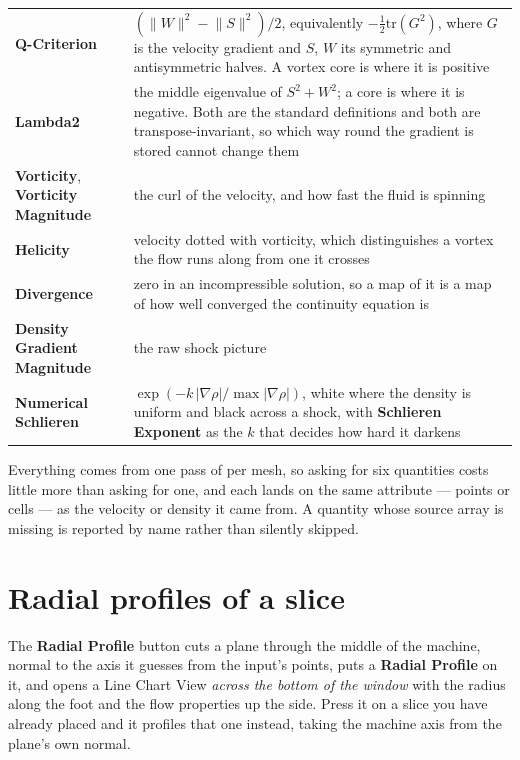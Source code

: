 \documentclass[11pt,a4paper]{article}
\newcommand{\prop}[1]{\textbf{#1}}          %
\newcommand{\menu}[1]{\textbf{#1}}          %
\begin{document}
\begin{center}
\begin{tabular}{@{}L{40mm}L{86mm}@{}}
\toprule
\prop{Q-Criterion} & $(\lVert W\rVert^2 - \lVert S\rVert^2)/2$, equivalently
  $-\tfrac{1}{2}\mathrm{tr}(G^2)$, where $G$ is the velocity gradient and $S$,
  $W$ its symmetric and antisymmetric halves. A vortex core is where it is
  positive \\
\prop{Lambda2} & the middle eigenvalue of $S^2 + W^2$; a core is where it is
  negative. Both are the standard definitions and both are transpose-invariant,
  so which way round the gradient is stored cannot change them \\
\prop{Vorticity}, \prop{Vorticity Magnitude} & the curl of the velocity, and how
  fast the fluid is spinning \\
\prop{Helicity} & velocity dotted with vorticity, which distinguishes a vortex
  the flow runs along from one it crosses \\
\prop{Divergence} & zero in an incompressible solution, so a map of it is a map
  of how well converged the continuity equation is \\
\prop{Density Gradient Magnitude} & the raw shock picture \\
\prop{Numerical Schlieren} & $\exp(-k\,|\nabla\rho| / \max|\nabla\rho|)$, white
  where the density is uniform and black across a shock, with \prop{Schlieren
  Exponent} as the $k$ that decides how hard it darkens \\
\bottomrule
\end{tabular}
\end{center}

Everything comes from one pass of  per mesh, so asking
for six quantities costs little more than asking for one, and each lands on the
same attribute --- points or cells --- as the velocity or density it came from.
A quantity whose source array is missing is reported by name rather than
silently skipped.

\section{Radial profiles of a slice}

The \menu{Radial Profile} button cuts a plane through the middle of the machine,
normal to the axis it guesses from the input's points, puts a \menu{Radial
Profile} on it, and opens a Line Chart View \emph{across the bottom of the
window} with the radius along the foot and the flow properties up the side.
Press it on a slice you have already placed and it profiles that one instead,
taking the machine axis from the plane's own normal.
\end{document}
